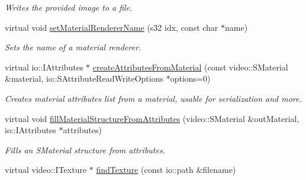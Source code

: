 \begin{DoxyCompactItemize}
\begin{DoxyCompactList}\small\item\em Writes the provided image to a file. \end{DoxyCompactList}\item 
\hypertarget{classirr_1_1video_1_1_c_null_driver_a586ef5fa5e4051094fbc473a96fede76}{virtual void \hyperlink{classirr_1_1video_1_1_c_null_driver_a586ef5fa5e4051094fbc473a96fede76}{set\-Material\-Renderer\-Name} (s32 idx, const char $\ast$name)}\label{classirr_1_1video_1_1_c_null_driver_a586ef5fa5e4051094fbc473a96fede76}

\begin{DoxyCompactList}\small\item\em Sets the name of a material renderer. \end{DoxyCompactList}\item 
\hypertarget{classirr_1_1video_1_1_c_null_driver_a4a8d14faa82e6be20a598dd03c515500}{virtual io\-::\-I\-Attributes $\ast$ \hyperlink{classirr_1_1video_1_1_c_null_driver_a4a8d14faa82e6be20a598dd03c515500}{create\-Attributes\-From\-Material} (const video\-::\-S\-Material \&material, io\-::\-S\-Attribute\-Read\-Write\-Options $\ast$options=0)}\label{classirr_1_1video_1_1_c_null_driver_a4a8d14faa82e6be20a598dd03c515500}

\begin{DoxyCompactList}\small\item\em Creates material attributes list from a material, usable for serialization and more. \end{DoxyCompactList}\item 
\hypertarget{classirr_1_1video_1_1_c_null_driver_ada29bf150ec5832b3953f26e6c787e42}{virtual void \hyperlink{classirr_1_1video_1_1_c_null_driver_ada29bf150ec5832b3953f26e6c787e42}{fill\-Material\-Structure\-From\-Attributes} (video\-::\-S\-Material \&out\-Material, io\-::\-I\-Attributes $\ast$attributes)}\label{classirr_1_1video_1_1_c_null_driver_ada29bf150ec5832b3953f26e6c787e42}

\begin{DoxyCompactList}\small\item\em Fills an S\-Material structure from attributes. \end{DoxyCompactList}\item 
\hypertarget{classirr_1_1video_1_1_c_null_driver_aced7cd681a20f6e4426e875343d31b79}{virtual video\-::\-I\-Texture $\ast$ \hyperlink{classirr_1_1video_1_1_c_null_driver_aced7cd681a20f6e4426e875343d31b79}{find\-Texture} (const io\-::path \&filename)}\label{classirr_1_1video_1_1_c_null_driver_aced7cd681a20f6e4426e875343d31b79}


\end{DoxyCompactItemize}
